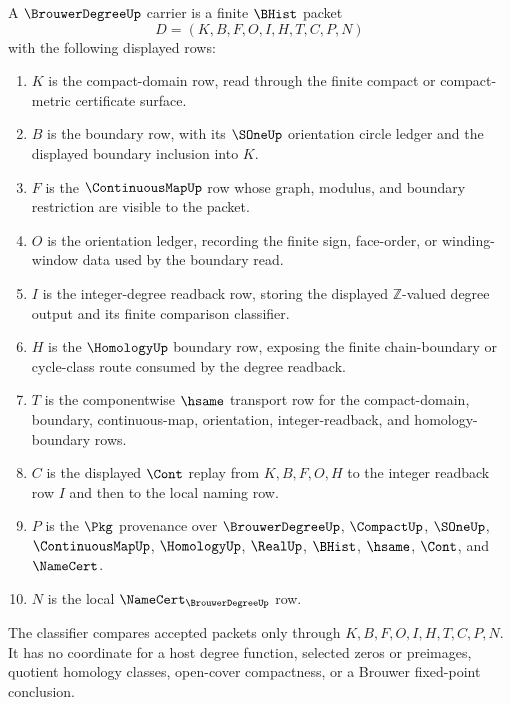\begin{definition}
\label{def:brouwer-degree-carrier}
A $\BrouwerDegreeUp$ carrier is a finite $\BHist$ packet
$$
D=(K,B,F,O,I,H,T,C,P,N)
$$
with the following displayed rows:
\begin{enumerate}
\item $K$ is the compact-domain row, read through the finite compact or compact-metric certificate surface.
\item $B$ is the boundary row, with its $\SOneUp$ orientation circle ledger and the displayed boundary inclusion into $K$.
\item $F$ is the $\ContinuousMapUp$ row whose graph, modulus, and boundary restriction are visible to the packet.
\item $O$ is the orientation ledger, recording the finite sign, face-order, or winding-window data used by the boundary read.
\item $I$ is the integer-degree readback row, storing the displayed $\mathbb{Z}$-valued degree output and its finite comparison classifier.
\item $H$ is the $\HomologyUp$ boundary row, exposing the finite chain-boundary or cycle-class route consumed by the degree readback.
\item $T$ is the componentwise $\hsame$ transport row for the compact-domain, boundary, continuous-map, orientation, integer-readback, and homology-boundary rows.
\item $C$ is the displayed $\Cont$ replay from $K,B,F,O,H$ to the integer readback row $I$ and then to the local naming row.
\item $P$ is the $\Pkg$ provenance over $\BrouwerDegreeUp$, $\CompactUp$, $\SOneUp$, $\ContinuousMapUp$, $\HomologyUp$, $\RealUp$, $\BHist$, $\hsame$, $\Cont$, and $\NameCert$.
\item $N$ is the local $\NameCert_{\BrouwerDegreeUp}$ row.
\end{enumerate}
The classifier compares accepted packets only through $K,B,F,O,I,H,T,C,P,N$. It has no coordinate for a host degree function, selected zeros or preimages, quotient homology classes, open-cover compactness, or a Brouwer fixed-point conclusion.
\end{definition}

